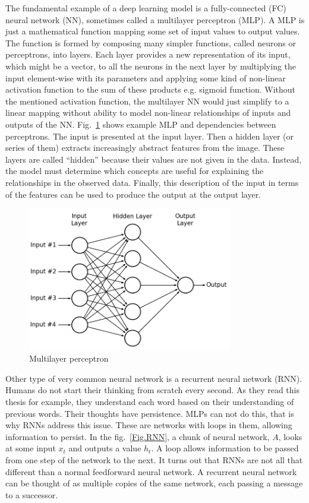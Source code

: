 The fundamental example of a deep learning model is a fully-connected (FC) neural network (NN), sometimes called a multilayer perceptron (MLP). A MLP is just a mathematical function mapping some set of input values to output values. The function is formed by composing many simpler functions, called neurons or perceptrons, into layers. Each layer provides a new representation of its input, which might be a vector, to all the neurons in the next layer by multiplying the input element-wise with its parameters and applying some kind of non-linear activation function to the sum of these products e.g. sigmoid function. Without the mentioned activation function, the multilayer NN would just simplify to a linear mapping without ability to model non-linear relationships of inputs and outputs of the NN. Fig.~\ref{Fig.MLP} shows example MLP and dependencies between perceptrons. The input is presented at the input layer. Then a hidden layer (or series of them) extracts increasingly abstract features from the image. These layers are called “hidden” because their values are not given in the data. Instead, the model must determine which concepts are useful for explaining the relationships in the observed data. Finally, this description of the input in terms of the features can be used to produce the output at the output layer.

\begin{figure}[H]
\includegraphics[width=0.8\textwidth,keepaspectratio]{figures/MLP.png}
\caption{Multilayer perceptron}
\label{Fig.MLP}
\end{figure}

Other type of very common neural network is a recurrent neural network (RNN). Humans do not start their thinking from scratch every second. As they read this thesis for example, they understand each word based on their understanding of previous words. Their thoughts have persistence. MLPs can not do this, that is why RNNs address this issue. These are networks with loops in them, allowing information to persist. In the fig.~\ref{Fig.RNN}, a chunk of neural network, $A$, looks at some input $x_t$ and outputs a value $h_t$. A loop allows information to be passed from one step of the network to the next. It turns out that RNNs are not all that different than a normal feedforward neural network. A recurrent neural network can be thought of as multiple copies of the same network, each passing a message to a successor.

